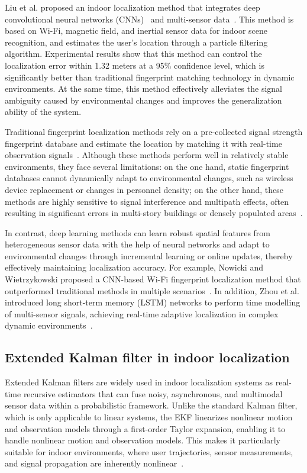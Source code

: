 \documentclass[12pt,a4paper]{article}
\numberwithin{equation}{section}
\begin{document}
Liu et al. proposed an indoor localization method that integrates deep
convolutional neural networks (CNNs)~ and multi-sensor data~\cite{s151229867}. This method is based on
Wi-Fi, magnetic field, and inertial sensor data for indoor scene recognition,
and estimates the user's location through a particle filtering
algorithm. Experimental results show that this method can control the
localization error within 1.32 meters at a 95\% confidence level, which is
significantly better than traditional fingerprint matching technology in dynamic
environments. At the same time, this method effectively alleviates the signal
ambiguity caused by environmental changes and improves the generalization
ability of the system.

Traditional fingerprint localization methods rely on a pre-collected signal
strength fingerprint database and estimate the location by matching it with
real-time observation signals~\cite{ijgi6050135}. Although these methods perform
well in relatively stable environments, they face several limitations: on the
one hand, static fingerprint databases cannot dynamically adapt to environmental
changes, such as wireless device replacement or changes in personnel density; on
the other hand, these methods are highly sensitive to signal interference and
multipath effects, often resulting in significant errors in multi-story
buildings or densely populated areas~\cite{zou2022magloc}.

In contrast, deep learning methods can learn robust spatial features from
heterogeneous sensor data with the help of neural networks and adapt to
environmental changes through incremental learning or online updates, thereby
effectively maintaining localization accuracy. For example, Nowicki and
Wietrzykowski proposed a CNN-based Wi-Fi fingerprint localization method that
outperformed traditional methods in multiple scenarios~\cite{nowicki2017ml}. In
addition, Zhou et al. introduced long short-term memory (LSTM) networks to
perform time modelling of multi-sensor signals, achieving real-time adaptive
localization in complex dynamic environments~\cite{zhou2022deep}.

\subsection{Extended Kalman filter in indoor localization}
Extended Kalman filters are widely used in indoor localization systems as
real-time recursive estimators that can fuse noisy, asynchronous, and multimodal
sensor data within a probabilistic framework. Unlike the standard Kalman filter,
which is only applicable to linear systems, the EKF linearizes nonlinear motion
and observation models through a first-order Taylor expansion, enabling it to
handle nonlinear motion and observation models. This makes it particularly
suitable for indoor environments, where user trajectories, sensor measurements,
and signal propagation are inherently nonlinear~\cite{barrau2015non}.
\end{document}
